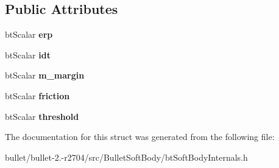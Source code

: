 \subsection*{Public Attributes}
\begin{DoxyCompactItemize}
\item 
\hypertarget{structbt_soft_colliders_1_1_cluster_base_a82d6cd269c34a357f57fad47d25a7944}{bt\+Scalar {\bfseries erp}}\label{structbt_soft_colliders_1_1_cluster_base_a82d6cd269c34a357f57fad47d25a7944}

\item 
\hypertarget{structbt_soft_colliders_1_1_cluster_base_aa4352eb15bb87065d0a563b7fa0e51c1}{bt\+Scalar {\bfseries idt}}\label{structbt_soft_colliders_1_1_cluster_base_aa4352eb15bb87065d0a563b7fa0e51c1}

\item 
\hypertarget{structbt_soft_colliders_1_1_cluster_base_a50d0c2e6bf7e3c8aeb52860bc92e5325}{bt\+Scalar {\bfseries m\+\_\+margin}}\label{structbt_soft_colliders_1_1_cluster_base_a50d0c2e6bf7e3c8aeb52860bc92e5325}

\item 
\hypertarget{structbt_soft_colliders_1_1_cluster_base_ae24b72c7cf2ccb09be9b158f95a4a97b}{bt\+Scalar {\bfseries friction}}\label{structbt_soft_colliders_1_1_cluster_base_ae24b72c7cf2ccb09be9b158f95a4a97b}

\item 
\hypertarget{structbt_soft_colliders_1_1_cluster_base_aa3eae39623570545e366bc8571e82ef0}{bt\+Scalar {\bfseries threshold}}\label{structbt_soft_colliders_1_1_cluster_base_aa3eae39623570545e366bc8571e82ef0}

\end{DoxyCompactItemize}


The documentation for this struct was generated from the following file\+:\begin{DoxyCompactItemize}
\item 
bullet/bullet-\/2.-\/r2704/src/\+Bullet\+Soft\+Body/bt\+Soft\+Body\+Internals.\+h\end{DoxyCompactItemize}
